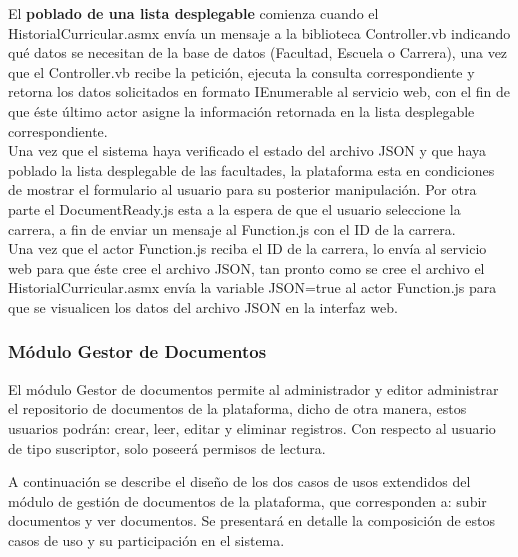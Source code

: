 		
		
	
		El   \textbf{poblado de una lista desplegable} comienza cuando el HistorialCurricular.asmx  envía un mensaje a  la  \label{Proceso_poblado_DDL} biblioteca Controller.vb indicando qué datos se necesitan de la base de datos (Facultad, Escuela o Carrera), una vez que el Controller.vb recibe la petición, ejecuta  la consulta correspondiente y  retorna los datos solicitados en formato IEnumerable al servicio web, con el fin de que éste último actor asigne la información retornada en la lista desplegable correspondiente.
		\\
		
	
		Una vez que  el sistema haya verificado el estado del archivo JSON y que haya poblado la lista desplegable de las facultades, la plataforma esta en condiciones de mostrar el formulario al usuario para su posterior manipulación.		Por otra parte el DocumentReady.js esta a la espera de que el usuario seleccione la carrera, a fin de enviar un mensaje al Function.js con el ID de la carrera.
		\\
		
		Una vez que el actor Function.js reciba el ID de la carrera,  lo envía al servicio web para que éste cree el archivo JSON, tan pronto como se cree el archivo el HistorialCurricular.asmx  envía la variable JSON=true al actor Function.js para que se visualicen los datos del archivo JSON en la interfaz web.
		
		\subsubsection{Módulo Gestor de Documentos}
	
	
		El  módulo Gestor de documentos permite al administrador y editor administrar el repositorio de documentos de la plataforma, dicho de otra manera, estos usuarios podrán: crear, leer, editar y eliminar registros. Con respecto al usuario de tipo suscriptor, solo poseerá permisos de lectura.
	
		
		A continuación se describe el diseño de los dos  casos de usos extendidos del módulo de gestión de documentos de la plataforma, que corresponden a: subir documentos y  ver documentos. Se presentará en detalle la composición de estos casos de uso y su participación en el sistema.
		
		




